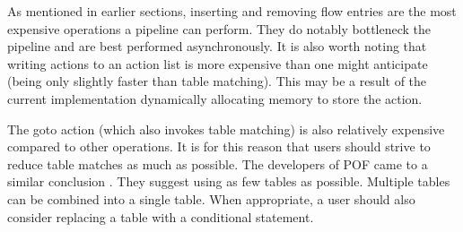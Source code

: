 As mentioned in earlier sections, inserting and removing flow entries are the most expensive operations a pipeline can perform. They do notably bottleneck the pipeline and are best performed asynchronously.
It is also worth noting that writing actions to an action list is more expensive than one might anticipate (being only slightly faster than table matching). This may be a result of the current implementation dynamically allocating memory to store the action.

The goto action (which also invokes table matching) is also relatively expensive compared to other operations. It is for this reason that users should strive to reduce table matches as much as possible. The developers of POF came to a similar conclusion \cite{pof_impl}. They suggest using as few tables as possible. Multiple tables can be combined into a single table. When appropriate, a user should also consider replacing a table with a conditional statement.

